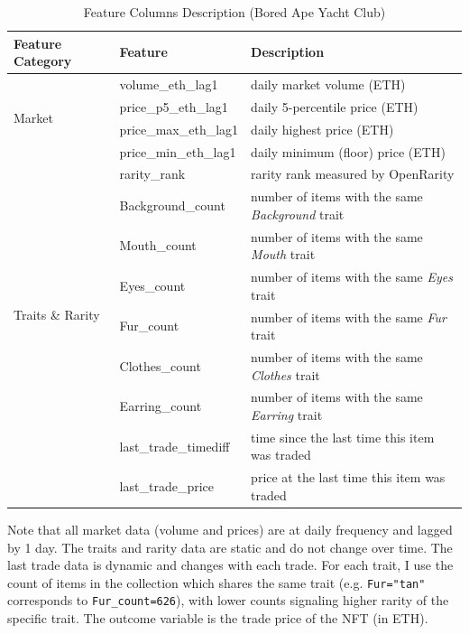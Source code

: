 \documentclass[12pt]{article}
\begin{document}
\begin{table}[H]
    \centering
    \caption{Feature Columns Description (Bored Ape Yacht Club)}
    \begin{tabular}{|l|l|l|}
    \hline
    \textbf{Feature Category} & \textbf{Feature} & \textbf{Description} \\ \hline

    \multirow{4}{*}{Market} & volume\_eth\_lag1 & daily market volume (ETH) \\ \cline{2-3} 
    & price\_p5\_eth\_lag1 & daily 5-percentile price (ETH) \\ \cline{2-3} 
    & price\_max\_eth\_lag1 & daily highest price (ETH) \\ \cline{2-3} 
    & price\_min\_eth\_lag1 & daily minimum (floor) price (ETH)\\ \hline

    \multirow{8}{*}{Traits \& Rarity} & rarity\_rank & rarity rank measured by OpenRarity \\ \cline{2-3} 
    & Background\_count & number of items with the same \textit{Background} trait \\ \cline{2-3} 
    & Mouth\_count & number of items with the same \textit{Mouth} trait \\ \cline{2-3} 
    & Eyes\_count & number of items with the same \textit{Eyes} trait\\ \cline{2-3} 
    & Fur\_count & number of items with the same \textit{Fur} trait \\ \cline{2-3}
    & Clothes\_count & number of items with the same \textit{Clothes} trait \\ \cline{2-3} 
    & Earring\_count & number of items with the same \textit{Earring} trait \\ \hline

    \multirow{2}{*}{Last Trade} & last\_trade\_timediff & time since the last time this item was traded \\ \cline{2-3} 
    & last\_trade\_price & price at the last time this item was traded\\ \hline
    \end{tabular}
    
    \label{tab: feature_columns}
\end{table}

Note that all market data (volume and prices) are at daily frequency and lagged by 1 day. The traits and rarity data are static and do not change over time. The last trade data is dynamic and changes with each trade. For each trait, I use the count of items in the collection which shares the same trait (e.g. \texttt{Fur="tan"} corresponds to \texttt{Fur\_count=626}), with lower counts signaling higher rarity of the specific trait. The outcome variable is the trade price of the NFT (in ETH).
    
\end{document}
